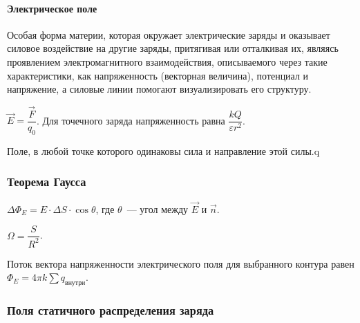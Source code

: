 \documentclass[12pt]{article}
\begin{document}
	\paragraph{Электрическое поле}
	
	\begin{definition}
		Особая форма материи, которая окружает электрические заряды и оказывает силовое воздействие на другие заряды, притягивая или отталкивая их, являясь проявлением электромагнитного взаимодействия, описываемого через такие характеристики, как напряженность (векторная величина), потенциал и напряжение, а силовые линии помогают визуализировать его структуру.
	\end{definition}
	
	\begin{definition}
		$\vec{E} = \dfrac{\vec{F}}{q_0}$. Для точечного заряда напряженность равна $\dfrac{kQ}{\varepsilon r^2}$.
	\end{definition}
	
	\begin{definition}
		Поле, в любой точке которого одинаковы сила и направление этой силы.q
	\end{definition}
	
	\subsubsection{Теорема Гаусса}
	
	\begin{definition}
		$\varDelta \Phi_{E} = E \cdot \varDelta S \cdot \cos \theta$, где $\theta$~--- угол между $\vec{E}$ и $\vec{n}$.
	\end{definition}
	
	\begin{definition}
		$\Omega = \dfrac{S}{R^2}$.
	\end{definition}
	
	\begin{theorem}
		Поток вектора напряженности электрического поля для выбранного контура равен $\Phi_{E} = 4 \pi k \sum q_{\text{внутри}}$.
	\end{theorem}
	
	\subsubsection{Поля статичного распределения заряда}
	
\end{document}
